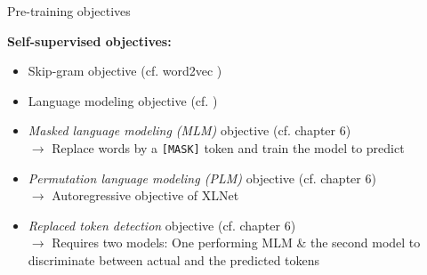 \begin{vbframe}{Pre-training objectives}

\vfill

\textbf{Self-supervised objectives:}
	
	\begin{itemize}
		\item Skip-gram objective (cf. word2vec \href{https://arxiv.org/pdf/1301.3781.pdf}{})
		\item Language modeling objective (cf. \href{http://www.jmlr.org/papers/volume3/bengio03a/bengio03a.pdf}{})
		\item \textit{Masked language modeling (MLM)} objective (cf. chapter 6)\\
					$\rightarrow$ Replace words by a \texttt{[MASK]} token and train the model to predict
		\item \textit{Permutation language modeling (PLM)} objective (cf. chapter 6)\\
					$\rightarrow$ Autoregressive objective of XLNet
		\item \textit{Replaced token detection} objective (cf. chapter 6)\\
					$\rightarrow$ Requires two models: One performing MLM \& the second model to discriminate between actual and the predicted tokens
	\end{itemize}
\vfill

\end{vbframe}


